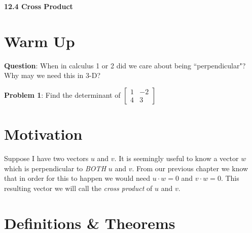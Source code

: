 \documentclass[11pt]{article}
\newcommand{\vs}{\vspace*{.1in}}
\begin{document}
\begin{LARGE}\begin{center}\bf 12.4 Cross Product \end{center}
\end{LARGE}

\vs\vs



\section{Warm Up}

\textbf{Question}: When in calculus 1 or 2 did we care about being ``perpendicular"? Why may we need this in 3-D?

\textbf{Problem 1}: Find the determinant of 
$\begin{bmatrix}
1 & -2 \\
4 & 3
\end{bmatrix}$


\section{Motivation}
Suppose I have two vectors $u$ and $v$. It is seemingly useful to know a vector $w$ which is perpendicular to \emph{BOTH} $u$ and $v$. From our previous chapter we know that in order for this to happen we would need $u \cdot w = 0$ and $v \cdot w = 0$. This resulting vector we will call the \emph{cross product} of $u$ and $v$.



\section{Definitions \& Theorems}
\end{document}
